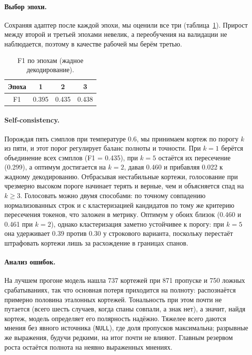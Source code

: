 \documentclass[11pt]{article}
\begin{document}
\paragraph{Выбор эпохи.}
Сохраняя адаптер после каждой эпохи, мы оценили все три (таблица~\ref{tab:epoch}). Прирост между второй и третьей
эпохами невелик, а переобучения на валидации не наблюдается, поэтому в качестве рабочей мы берём третью.

\begin{table}[h]
\centering
\caption{F1 по эпохам (жадное декодирование).}
\label{tab:epoch}
\begin{tabular}{cccc}
\toprule
Эпоха & 1 & 2 & 3 \\
\midrule
F1 & 0.395 & 0.435 & 0.438 \\
\bottomrule
\end{tabular}
\end{table}

\paragraph{Self-consistency.}
Порождая пять сэмплов при температуре 0.6, мы принимаем кортеж по порогу $k$ из пяти, и этот порог регулирует
баланс полноты и точности. При $k=1$ берётся объединение всех сэмплов (F1 = 0.435), при $k=5$ остаётся их
пересечение (0.299), а оптимум достигается на $k=2$, давая 0.460 и прибавляя 0.022 к жадному декодированию.
Отбрасывая нестабильные кортежи, голосование при чрезмерно высоком пороге начинает терять и верные, чем и
объясняется спад на $k\ge 3$. Голосовать можно двумя способами: по точному совпадению нормализованных строк и
с кластеризацией кандидатов по тому же критерию пересечения токенов, что заложен в метрику. Оптимум у обоих близок
(0.460 и 0.461 при $k=2$), однако кластеризация заметно устойчивее к порогу: при $k=5$ она удерживает 0.39 против
0.30 у строкового варианта, поскольку перестаёт штрафовать кортежи лишь за расхождение в границах спанов.

\paragraph{Анализ ошибок.}
На лучшем прогоне модель нашла 737 кортежей при 871 пропуске и 750 ложных срабатываниях, так что основная потеря
приходится на полноту: распознаётся примерно половина эталонных кортежей. Тональность при этом почти не путается
(всего шесть случаев, когда спаны совпали, а знак нет), а значит, найдя кортеж, модель определяет его полярность
надёжно. Тяжелее всего даются мнения без явного источника (\texttt{NULL}), где доля пропусков максимальна; разрывные
же выражения, будучи редкими, на итог почти не влияют. Главным резервом роста остаётся полнота на неявно выраженных
мнениях.
\end{document}
